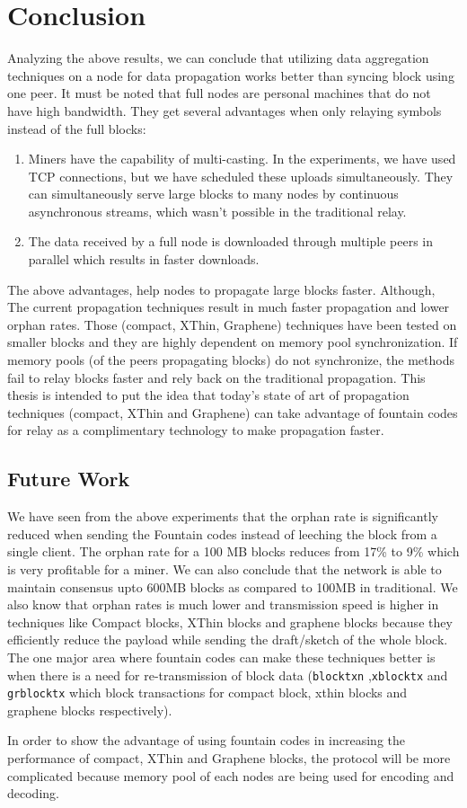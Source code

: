 \chapter{Conclusion}
Analyzing the above results, we can conclude that utilizing data aggregation
techniques on a node for data propagation works better than syncing block using
one peer.
It must be noted that full nodes are personal machines that do not have high
bandwidth. They get several advantages when only relaying symbols instead of the
full blocks:

\begin{enumerate}
    \item Miners have the capability of multi-casting. In the experiments, we
        have used TCP connections, but we have scheduled these uploads
        simultaneously. They can simultaneously serve large blocks to many nodes by
        continuous asynchronous streams, which wasn't possible in the traditional relay.
    \item The data received by a full node is downloaded through multiple peers in parallel which results in faster downloads.
\end{enumerate}

The above advantages, help nodes to propagate large blocks faster. 
Although, The current propagation techniques result in much faster propagation and
lower orphan rates. Those (compact, XThin, Graphene) techniques have been tested on smaller blocks and they are highly dependent on memory pool synchronization. If memory pools (of the peers propagating blocks) do not synchronize, the methods fail to relay blocks faster and rely back on the traditional propagation. This thesis is intended to put the idea that today's state of art of propagation techniques (compact, XThin and Graphene) can take advantage of fountain codes for relay as a complimentary technology to make propagation faster. 

\section{Future Work}

We have seen from the above experiments that the orphan rate is significantly
reduced when sending the Fountain codes instead of leeching the block from a
single client. The orphan rate for a 100 MB blocks reduces from 17\% to 9\% 
which is very profitable for a miner.  
We can also conclude that the network is able to maintain consensus upto 600MB blocks as compared to 100MB in traditional.
We also know that orphan rates is much lower and transmission speed is higher in
techniques like Compact blocks, XThin blocks and graphene blocks because they
efficiently reduce the payload while sending the draft/sketch of the whole
block. The one major area where fountain codes can make these techniques better
is when there is a need for re-transmission of block data (\texttt{blocktxn}
,\texttt{xblocktx}
and \texttt{grblocktx} which block transactions for compact block, xthin blocks and
graphene blocks respectively).

In order to show the advantage of using fountain codes in increasing the
performance of compact, XThin and Graphene blocks, the protocol will be more
complicated because memory pool of each nodes are being used for encoding and
decoding. 

